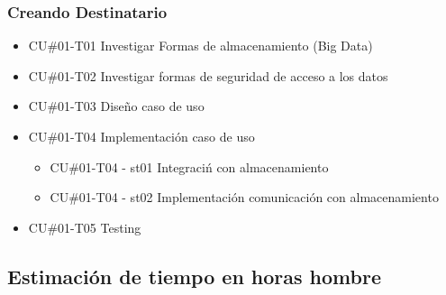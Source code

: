 \documentclass[a4paper, 11pt]{article}
\begin{document}
\subsubsection{Creando Destinatario}
\begin{itemize}
\item{CU\#01-T01} Investigar Formas de almacenamiento (Big Data)
\item{CU\#01-T02} Investigar formas de seguridad de acceso a los datos
\item{CU\#01-T03} Dise\~no caso de uso
\item{CU\#01-T04} Implementaci\'on caso de uso
\begin{itemize}
\item{CU\#01-T04 - st01} Integraci\'n con almacenamiento
\item{CU\#01-T04 - st02} Implementaci\'on comunicaci\'on con almacenamiento
\end{itemize}
\item{CU\#01-T05} Testing
\end{itemize}
\subsection{Estimaci\'on de tiempo en horas hombre}

\end{document}

